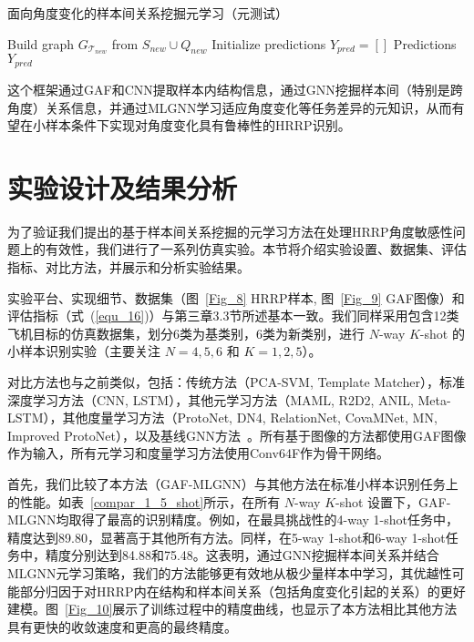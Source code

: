 \begin{algorithm}[h]
\SetAlgoLined
\DontPrintSemicolon
\LinesNumbered
\footnotesize
\caption{面向角度变化的样本间关系挖掘元学习（元测试）}
\label{alg:meta_testing_angle}
Build graph $G_{\mathcal{T}_{new}}$ from $S_{new} \cup Q_{new}$\;
Initialize predictions $Y_{pred} = []$\;
\Return Predictions $Y_{pred}$
\end{algorithm}
这个框架通过GAF和CNN提取样本内结构信息，通过GNN挖掘样本间（特别是跨角度）关系信息，并通过MLGNN学习适应角度变化等任务差异的元知识，从而有望在小样本条件下实现对角度变化具有鲁棒性的HRRP识别。

\section{实验设计及结果分析}
\label{sec:experiments_angle}

为了验证我们提出的基于样本间关系挖掘的元学习方法在处理HRRP角度敏感性问题上的有效性，我们进行了一系列仿真实验。本节将介绍实验设置、数据集、评估指标、对比方法，并展示和分析实验结果。

实验平台、实现细节、数据集（图~\ref{Fig_8} HRRP样本, 图~\ref{Fig_9} GAF图像）和评估指标（式~(\ref{equ_16})）与第三章3.3节所述基本一致。我们同样采用包含12类飞机目标的仿真数据集，划分6类为基类别，6类为新类别，进行 $N$-way $K$-shot 的小样本识别实验（主要关注 $N=4, 5, 6$ 和 $K=1, 2, 5$）。

对比方法也与之前类似，包括：传统方法（PCA-SVM, Template Matcher），标准深度学习方法（CNN, LSTM），其他元学习方法（MAML, R2D2, ANIL, Meta-LSTM），其他度量学习方法（ProtoNet, DN4, RelationNet, CovaMNet, MN, Improved ProtoNet），以及基线GNN方法~\cite{ref42}。所有基于图像的方法都使用GAF图像作为输入，所有元学习和度量学习方法使用Conv64F作为骨干网络。

首先，我们比较了本方法（GAF-MLGNN）与其他方法在标准小样本识别任务上的性能。如表~\ref{compar_1_5_shot}所示，在所有 $N$-way $K$-shot 设置下，GAF-MLGNN均取得了最高的识别精度。例如，在最具挑战性的4-way 1-shot任务中，精度达到89.80，显著高于其他所有方法。同样，在5-way 1-shot和6-way 1-shot任务中，精度分别达到84.88和75.48。这表明，通过GNN挖掘样本间关系并结合MLGNN元学习策略，我们的方法能够更有效地从极少量样本中学习，其优越性可能部分归因于对HRRP内在结构和样本间关系（包括角度变化引起的关系）的更好建模。图~\ref{Fig_10}展示了训练过程中的精度曲线，也显示了本方法相比其他方法具有更快的收敛速度和更高的最终精度。

